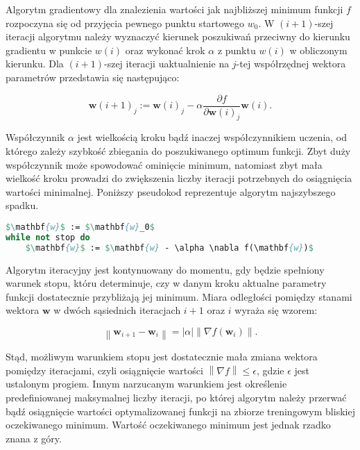 \documentclass{pracamgr}
\newcommand{\norm}[1]{\left\lVert#1\right\rVert}
\newcommand{\abs}[1]{\lvert#1\rvert}
\begin{document}
Algorytm gradientowy dla znalezienia wartości jak najbliższej minimum funkcji $f$ rozpoczyna się od przyjęcia pewnego punktu startowego $w_0$. W $(i+1)$-szej iteracji algorytmu należy wyznaczyć kierunek poszukiwań przeciwny do kierunku gradientu w punkcie $w(i)$ oraz wykonać krok $\alpha$ z punktu $w(i)$ w obliczonym kierunku. Dla $(i+1)$-szej iteracji uaktualnienie na $j$-tej współrzędnej wektora parametrów przedstawia się następująco:

\[
\mathbf{w}(i+1)_{j} := \mathbf{w}(i)_j - \alpha \frac{\partial f}{\partial \mathbf{w}(i)_j}\mathbf{w}(i).
\]

Współczynnik $\alpha$ jest wielkością kroku bądź inaczej współczynnikiem uczenia, od którego zależy szybkość zbiegania do poszukiwanego optimum funkcji. Zbyt duży współczynnik może spowodować ominięcie minimum, natomiast zbyt mała wielkość kroku prowadzi do zwiększenia liczby iteracji potrzebnych do osiągnięcia wartości minimalnej. Poniższy pseudokod reprezentuje algorytm najszybszego spadku.

\begin{minipage}{\linewidth}
\begin{lstlisting}[language=Pascal, mathescape=true,frame=single,caption={Metoda najszybszego spadku},captionpos=b]
$\mathbf{w}$ := $\mathbf{w}_0$
while not stop do
    $\mathbf{w}$ := $\mathbf{w} - \alpha \nabla f(\mathbf{w})$

\end{lstlisting}
\end{minipage}

Algorytm iteracyjny jest kontynuowany do momentu, gdy będzie spełniony warunek stopu, któru determinuje, czy w danym kroku aktualne parametry funkcji dostatecznie przybliżają jej minimum. Miara odległości pomiędzy stanami wektora $\mathbf{w}$ w dwóch sąsiednich iteracjach $i+1$ oraz $i$ wyraża się wzorem:

\[
\norm{\mathbf{w}_{i+1} - \mathbf{w}_{i}} = \abs{\alpha} \norm{\nabla f(\mathbf{w}_{i})}.
\]

Stąd, możliwym warunkiem stopu jest dostatecznie mała zmiana wektora pomiędzy iteracjami, czyli osiągnięcie wartości $\norm{\nabla f} \leq \epsilon$, gdzie $\epsilon$ jest ustalonym progiem. Innym narzucanym warunkiem jest określenie predefiniowanej maksymalnej liczby iteracji, po której algorytm należy przerwać bądź osiągnięcie wartości optymalizowanej funkcji na zbiorze treningowym bliskiej oczekiwanego minimum. Wartość oczekiwanego minimum jest jednak rzadko znana z góry.
\end{document}
